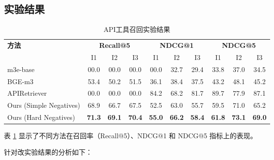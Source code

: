 \subsection{实验结果}

\begin{table}[!ht]
  \centering
  \caption{API工具召回实验结果}
  \label{tab:comparison}
  \begin{tabular}{l|ccc|ccc|ccc}
    \toprule
    \textbf{方法} & \multicolumn{3}{c|}{\textbf{Recall@5}} & \multicolumn{3}{c|}{\textbf{NDCG@1}} & \multicolumn{3}{c}{\textbf{NDCG@5}} \\
    & I1 & I2 & I3 & I1 & I2 & I3 & I1 & I2 & I3 \\
    \midrule

    m3e-base            & 00.0 & 00.0 & 00.0 & 00.0 & 32.7 & 29.4 & 33.8 & 37.0 & 34.5 \\
    BGE-m3         & 53.4 & 50.2 & 51.5 & 36.1 & 38.4 & 37.5 & 43.2 & 48.1 & 45.2 \\
    APIRetriever & 00.0 & 00.0 & 00.0 & 84.2 & 68.2 & 81.7 & 89.7 & 77.9 & 87.1 \\
    Ours (Simple Negatives)   & 68.9 & 66.7 & 67.5 & 52.5 & 63.0 & 55.7 & 59.5 & 71.0 & 65.2 \\
    Ours (Hard Negatives)     & \textbf{71.3} & \textbf{69.1} & \textbf{70.4} & \textbf{55.0} & \textbf{66.2} & \textbf{58.4} & \textbf{61.8} & \textbf{73.1} & \textbf{69.0} \\ 
    \bottomrule
  \end{tabular}
\end{table}

表 \ref{tab:comparison} 显示了不同方法在召回率（Recall@5）、NDCG@1 和 NDCG@5 指标上的表现。

针对改实验结果的分析如下：

